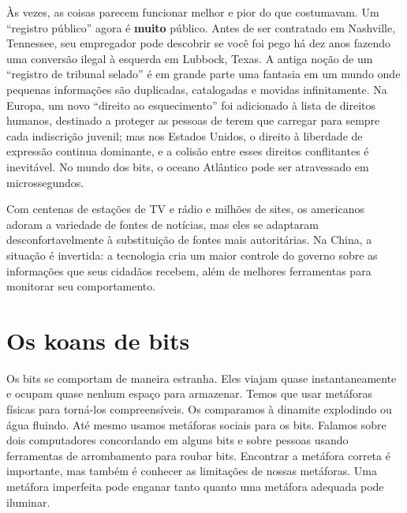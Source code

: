 Às vezes, as coisas parecem funcionar melhor e pior do que costumavam. Um
``registro público'' agora é \textbf{muito} público. Antes de ser contratado em
Nashville, Tennessee, seu empregador pode descobrir se você foi pego há dez anos 
fazendo uma conversão ilegal à esquerda em Lubbock, Texas. A antiga noção de um 
``registro de tribunal selado'' é em grande parte uma fantasia em um mundo onde 
pequenas informações são duplicadas, catalogadas e movidas infinitamente. Na 
Europa, um novo ``direito ao esquecimento'' foi adicionado à lista de direitos 
humanos, destinado a proteger as pessoas de terem que carregar para sempre cada 
indiscrição juvenil; mas nos Estados Unidos, o direito à liberdade de expressão 
continua dominante, e a colisão entre esses direitos conflitantes é inevitável. 
No mundo dos bits, o oceano Atlântico pode ser atravessado em microssegundos.

Com centenas de estações de TV e rádio e milhões de sites, os americanos adoram 
a variedade de fontes de notícias, mas eles se adaptaram desconfortavelmente à 
substituição de fontes mais autoritárias. Na China, a situação é invertida: a 
tecnologia cria um maior controle do governo sobre as informações que seus 
cidadãos recebem, além de melhores ferramentas para monitorar seu comportamento.


\section{Os koans de bits}
\label{cap1:exp-dig-koans}

Os bits se comportam de maneira estranha. Eles viajam quase instantaneamente e 
ocupam quase nenhum espaço para armazenar. Temos que usar metáforas físicas para 
torná-los compreensíveis. Os comparamos à dinamite explodindo ou água fluindo. 
Até mesmo usamos metáforas sociais para os bits. Falamos sobre dois computadores 
concordando em alguns bits e sobre pessoas usando ferramentas de arrombamento 
para roubar bits. Encontrar a metáfora correta é importante, mas também é 
conhecer as limitações de nossas metáforas. Uma metáfora imperfeita pode enganar 
tanto quanto uma metáfora adequada pode iluminar.

